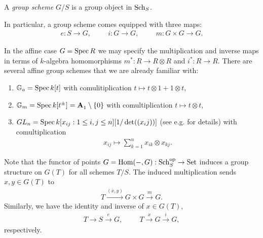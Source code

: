 \documentclass{article}
\begin{document}
\begin{definition}
  A \emph{group scheme} $G/S$ is a group object in $\operatorname{Sch}_S$.
\end{definition}

In particular, a group scheme comes equipped with three maps:
\begin{align*}
  e:S\to G,\hspace{1cm} i:G\to G,\hspace{1cm} m:G\times G\to G.
\end{align*}

\begin{example}
  In the affine case $G = \operatorname{Spec} R$ we may specify the multiplication
  and inverse maps in terms of $k$-algebra homomorphisms
  $m^* : R \to R\otimes R$ and $i^* : R\to R$.
  There are several affine group schemes that we are already familiar
  with:
  \begin{enumerate}
    \item $\mathbb{G}_a = \operatorname{Spec} k[t]$ with comulitiplication
      $t\mapsto t\otimes 1 + 1\otimes t$,
    \item $\mathbb{G}_m = \operatorname{Spec} k[t^\pm] = \mathbf{A}^{}_{1} \setminus \left\lbrace{0}\right\rbrace$ with comultiplication
      $t\mapsto t\otimes t$,
    \item $GL_n = \operatorname{Spec} k[x_{ij} : 1\leq i,j\leq n][1/\det((x_ij))]$
      (see e.g. \cite[\href{https://stacks.math.columbia.edu/tag/022W}{Tag 022W}]{stacks-project} for details) with
      comultiplication
      \begin{align*}
        x_{ij} \mapsto \sum_{k=1}^n x_{ik}\otimes x_{kj}.
      \end{align*}
  \end{enumerate}
\end{example}

Note that the functor of points $G=\operatorname{Hom}(-,G):{\operatorname{Sch}}^\text{op}_S\to\operatorname{Set}$ induces a
group structure on $G(T)$ for all schemes $T/S$. The induced multiplication
sends $x,y\in G(T)$ to
\begin{align}\label{eq:induced_multiplication_of_points}
  T \xrightarrow{(x,y)}
  G\times G\xrightarrow{m}
  G.
\end{align}
Similarly, we have the identity and inverse of $x\in G(T)$,
\begin{align*}
  T \rightarrow S \xrightarrow{e} G,\hspace{1cm}
  T \xrightarrow{x} G \xrightarrow{i} G,
\end{align*}
respectively.
\end{document}

